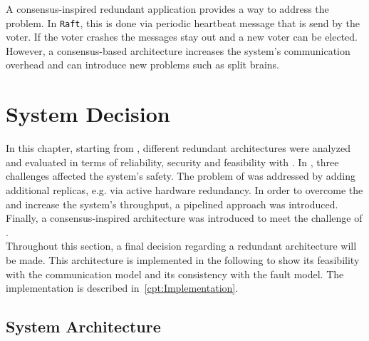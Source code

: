 A consensus-inspired redundant application provides a way to address the \ChallengeVoter problem.
In \texttt{Raft}, this is done via periodic heartbeat message that is send by the voter.
If the voter crashes the messages stay out and a new voter can be elected.
However, a consensus-based architecture increases the system's communication overhead and can introduce new problems such as split brains.


\section{System Decision}
In this chapter, starting from , different redundant architectures were analyzed and evaluated in terms of reliability, security and feasibility with .
In , three challenges affected the system's safety.
The problem of \ChallengeWR was addressed by adding additional replicas, e.g. via active hardware redundancy.
In order to overcome the \ChallengeThrough and increase the system's throughput, a pipelined approach was introduced.
Finally, a consensus-inspired architecture was introduced to meet the challenge of \ChallengeVoter.
\\

Throughout this section, a final decision regarding a redundant architecture will be made.
This architecture is implemented in the following to show its feasibility with the  communication model and its consistency with the fault model.
The implementation is described in~\autoref{cpt:Implementation}.

\subsection{System Architecture}
\label{subsec:SystemArchitecture}

